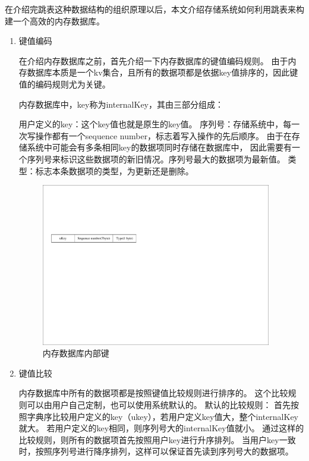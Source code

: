 		在介绍完跳表这种数据结构的组织原理以后，本文介绍存储系统如何利用跳表来构建一个高效的内存数据库。

		\begin{enumerate}
			\item 键值编码
			
			在介绍内存数据库之前，首先介绍一下内存数据库的键值编码规则。
			由于内存数据库本质是一个kv集合，且所有的数据项都是依据key值排序的，因此键值的编码规则尤为关键。

			内存数据库中，key称为internalKey，其由三部分组成：

			用户定义的key：这个key值也就是原生的key值。
			序列号：存储系统中，每一次写操作都有一个sequence number，标志着写入操作的先后顺序。
			由于在存储系统中可能会有多条相同key的数据项同时存储在数据库中，
			因此需要有一个序列号来标识这些数据项的新旧情况。序列号最大的数据项为最新值。
			类型：标志本条数据项的类型，为更新还是删除。

			\begin{figure}[H]
				\centering
				\includegraphics[width=0.95\textwidth]{pdf/internalkey}
				\caption{内存数据库内部键}
				\label{internalkey}
			\end{figure}

			\item 键值比较
			
			内存数据库中所有的数据项都是按照键值比较规则进行排序的。
			这个比较规则可以由用户自己定制，也可以使用系统默认的。
			默认的比较规则：
			首先按照字典序比较用户定义的key（ukey），若用户定义key值大，整个internalKey就大。
			若用户定义的key相同，则序列号大的internalKey值就小。
			通过这样的比较规则，则所有的数据项首先按照用户key进行升序排列。
			当用户key一致时，按照序列号进行降序排列，这样可以保证首先读到序列号大的数据项。



\end{enumerate}
